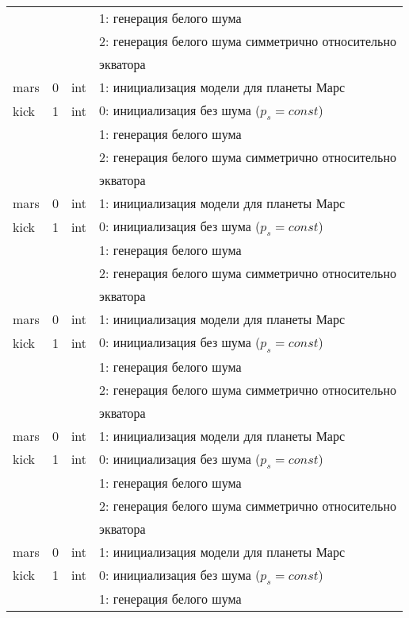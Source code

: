 \begin{longtable}[c]{|l|c|l|l|}
          &   &     & 1: генерация белого шума                  \\
          &   &     & 2: генерация белого шума симметрично относительно \\
      & & & экватора    \\
     mars & 0 & int & 1: инициализация модели для планеты Марс     \\
    kick & 1 & int & 0: инициализация без шума ($p_s = const$) \\
          &   &     & 1: генерация белого шума                  \\
          &   &     & 2: генерация белого шума симметрично относительно \\
      & & & экватора    \\
     mars & 0 & int & 1: инициализация модели для планеты Марс     \\
    kick & 1 & int & 0: инициализация без шума ($p_s = const$) \\
          &   &     & 1: генерация белого шума                  \\
          &   &     & 2: генерация белого шума симметрично относительно \\
      & & & экватора    \\
     mars & 0 & int & 1: инициализация модели для планеты Марс     \\
    kick & 1 & int & 0: инициализация без шума ($p_s = const$) \\
          &   &     & 1: генерация белого шума                  \\
          &   &     & 2: генерация белого шума симметрично относительно \\
      & & & экватора    \\
     mars & 0 & int & 1: инициализация модели для планеты Марс     \\
    kick & 1 & int & 0: инициализация без шума ($p_s = const$) \\
          &   &     & 1: генерация белого шума                  \\
          &   &     & 2: генерация белого шума симметрично относительно \\
      & & & экватора    \\
     mars & 0 & int & 1: инициализация модели для планеты Марс     \\
    kick & 1 & int & 0: инициализация без шума ($p_s = const$) \\
          &   &     & 1: генерация белого шума                  \\

\end{longtable}
